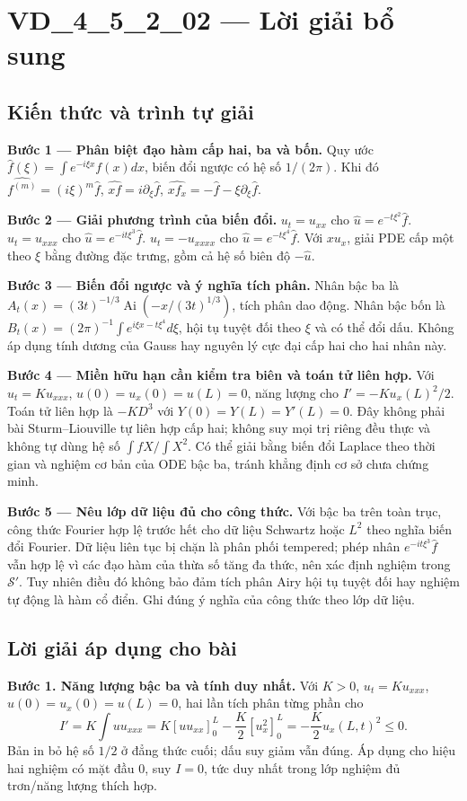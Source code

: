 \documentclass[10pt,a4paper]{article}
\begin{document}
\section*{VD\_4\_5\_2\_02 — Lời giải bổ sung}
\subsection*{Kiến thức và trình tự giải}
\textbf{Bước 1 — Phân biệt đạo hàm cấp hai, ba và bốn.} Quy ước $\widehat f(\xi)=\int e^{-i\xi x}f(x)dx$, biến đổi ngược có hệ số $1/(2\pi)$. Khi đó $\widehat{f^{(m)}}=(i\xi)^m\widehat f$, $\widehat{xf}=i\partial_\xi\widehat f$, $\widehat{xf_x}=-\widehat f-\xi\partial_\xi\widehat f$.

\textbf{Bước 2 — Giải phương trình của biến đổi.} $u_t=u_{xx}$ cho $\widehat u=e^{-t\xi^2}\widehat f$. $u_t=u_{xxx}$ cho $\widehat u=e^{-it\xi^3}\widehat f$. $u_t=-u_{xxxx}$ cho $\widehat u=e^{-t\xi^4}\widehat f$. Với $xu_x$, giải PDE cấp một theo $\xi$ bằng đường đặc trưng, gồm cả hệ số biên độ $-\widehat u$.

\textbf{Bước 3 — Biến đổi ngược và ý nghĩa tích phân.} Nhân bậc ba là $A_t(x)=(3t)^{-1/3}\operatorname{Ai}(-x/(3t)^{1/3})$, tích phân dao động. Nhân bậc bốn là $B_t(x)=(2\pi)^{-1}\int e^{i\xi x-t\xi^4}d\xi$, hội tụ tuyệt đối theo $\xi$ và có thể đổi dấu. Không áp dụng tính dương của Gauss hay nguyên lý cực đại cấp hai cho hai nhân này.

\textbf{Bước 4 — Miền hữu hạn cần kiểm tra biên và toán tử liên hợp.} Với $u_t=Ku_{xxx}$, $u(0)=u_x(0)=u(L)=0$, năng lượng cho $I'=-K u_x(L)^2/2$. Toán tử liên hợp là $-KD^3$ với $Y(0)=Y(L)=Y'(L)=0$. Đây không phải bài Sturm–Liouville tự liên hợp cấp hai; không suy mọi trị riêng đều thực và không tự dùng hệ số $\int fX/\int X^2$. Có thể giải bằng biến đổi Laplace theo thời gian và nghiệm cơ bản của ODE bậc ba, tránh khẳng định cơ sở chưa chứng minh.

\textbf{Bước 5 — Nêu lớp dữ liệu đủ cho công thức.} Với bậc ba trên toàn trục, công thức Fourier hợp lệ trước hết cho dữ liệu Schwartz hoặc $L^2$ theo nghĩa biến đổi Fourier. Dữ liệu liên tục bị chặn là phân phối tempered; phép nhân $e^{-it\xi^3}\widehat f$ vẫn hợp lệ vì các đạo hàm của thừa số tăng đa thức, nên xác định nghiệm trong $\mathcal S\prime$. Tuy nhiên điều đó không bảo đảm tích phân Airy hội tụ tuyệt đối hay nghiệm tự động là hàm cổ điển. Ghi đúng ý nghĩa của công thức theo lớp dữ liệu.
\subsection*{Lời giải áp dụng cho bài}
\textbf{Bước 1. Năng lượng bậc ba và tính duy nhất.}
Với $K>0$, $u_t=Ku_{xxx}$, $u(0)=u_x(0)=u(L)=0$, hai lần tích phân từng phần cho
\[I'=K\int uu_{xxx}
=K[uu_{xx}]_0^L-\frac K2[u_x^2]_0^L
=-\frac K2u_x(L,t)^2\le0.\]
Bản in bỏ hệ số $1/2$ ở đẳng thức cuối; dấu suy giảm vẫn đúng. Áp dụng cho hiệu hai nghiệm có mặt đầu $0$, suy $I=0$, tức duy nhất trong lớp nghiệm đủ trơn/năng lượng thích hợp.
\end{document}
